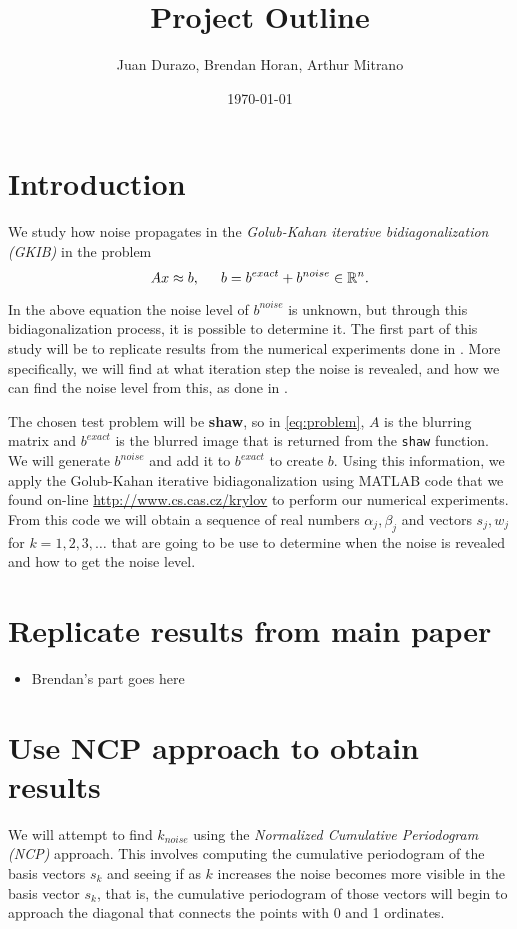 \documentclass[11pt]{amsart}
\title{Project Outline}
\author{Juan Durazo, Brendan Horan, Arthur Mitrano}
\date{\today}  %
\begin{document}
\maketitle

\section{Introduction}
We study how noise propagates in the \emph{Golub-Kahan iterative bidiagonalization (GKIB)} in the
problem 
\begin{equation} \label{eq:problem}
	Ax\approx b, \indent  b=b^{exact} + b^{noise} \in \mathbb{R}^n.
\end{equation}

In the above equation the noise level of $b^{noise}$ is unknown, but through this bidiagonalization
process, it is possible to determine it. The first part of this study will be to replicate results
from the numerical experiments done in \cite{bidiagonalization}. More specifically, we will find
at what iteration step the noise is revealed, and how we can find the noise level from this, as
done in \cite{bidiagonalization}.

The chosen test problem will be {\bf shaw}, so in \eqref{eq:problem}, $A$ is the blurring matrix and
$b^{exact}$ is the blurred image that is returned from the \texttt{shaw} function. We will generate 
$b^{noise}$ and add it to $b^{exact}$ to create $b$. Using this information, we apply the Golub-Kahan
iterative bidiagonalization using MATLAB code that we found on-line \url{http://www.cs.cas.cz/krylov}
to perform our numerical experiments. From this code we will obtain a sequence of real numbers 
$\alpha_j,\beta_j$ and vectors $s_j,w_j$ for $k=1,2,3,\ldots$ that are going to be use to determine
when the noise is revealed and how to get the noise level.


\section{Replicate results from main paper}
\begin{itemize}
\item Brendan's part goes here
\end{itemize}

\section{Use NCP approach to obtain results}
We will attempt to find $k_{noise}$ using the \emph{Normalized Cumulative Periodogram (NCP)} approach.
This involves computing the cumulative periodogram of the basis vectors $s_k$ and seeing if as $k$ 
increases the noise becomes more visible in the basis vector $s_k$, that is, the cumulative periodogram
of those vectors will begin to approach the diagonal that connects the points with 0 and 1 ordinates.
 
\end{document}
